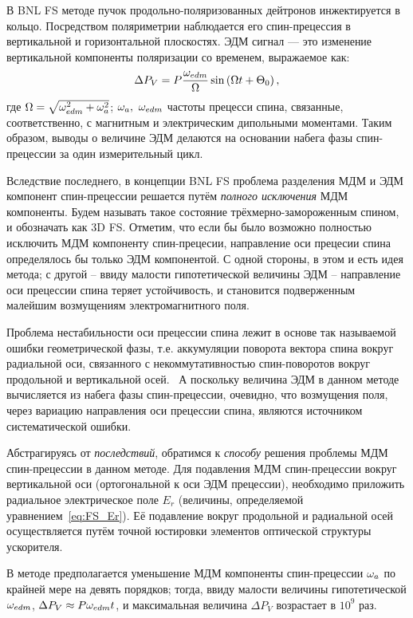 В BNL FS методе пучок продольно-поляризованных дейтронов инжектируется в кольцо. 
Посредством поляриметрии наблюдается его спин-прецессия в вертикальной и горизонтальной плоскостях. 
ЭДМ сигнал --- это изменение вертикальной компоненты поляризации со временем, 
выражаемое как:~\cite[стр.~8]{BNL:Deuteron2008}
\begin{equation}
  \Delta P_V = P\frac{\w_{edm}}{\W}\sin\bkt{\W t + \Theta_0},
\end{equation}
где $\Omega = \sqrt{\omega_{edm}^2 + \omega_a^2}$; $\omega_a,~\omega_{edm}$ частоты прецесси спина,
связанные, соответственно, с магнитным и электрическим дипольными моментами. 
Таким образом, выводы о величине ЭДМ делаются на основании набега фазы спин-прецессии 
за один измерительный цикл.

Вследствие последнего, в концепции BNL FS проблема разделения МДМ и ЭДМ компонент спин-прецессии
решается путём \emph{полного исключения} МДМ компоненты. 
Будем называть такое состояние  трёхмерно-замороженным спином, и обозначать как 3D FS. 
Отметим, что если бы было возможно полностью исключить МДМ компоненту спин-прецесии, 
направление оси прецесии спина определялось бы только ЭДМ компонентой.
С одной стороны, в этом и есть идея метода; с другой -- ввиду малости гипотетической величины ЭДМ --
направление оси прецессии спина теряет устойчивость, и становится подверженным малейшим возмущениям
электромагнитного поля. 

Проблема нестабильности оси прецессии спина лежит в основе так называемой 
ошибки геометрической фазы, т.е. аккумуляции поворота вектора спина вокруг радиальной оси, 
связанного с некоммутативностью спин-поворотов 
вокруг продольной и вертикальной осей.~\cite[стр.~23]{BNL:Deuteron2008} 
А поскольку величина ЭДМ в данном методе вычисляется из набега фазы спин-прецессии, очевидно, что
возмущения поля, через вариацию направления оси прецессии спина, являются источником
систематической ошибки.

Абстрагируясь от \emph{последствий}, обратимся к \emph{способу} решения проблемы 
МДМ спин-прецессии в данном методе.
Для подавления МДМ спин-прецессии вокруг вертикальной оси 
(ортогональной к оси ЭДМ прецессии), необходимо приложить
 радиальное электрическое поле $E_r$ (величины, определяемой уравнением~\eqref{eq:FS_Er}). 
Её подавление вокруг продольной и радиальной осей осуществляется путём
точной юстировки элементов оптической структуры ускорителя.

В методе предполагается уменьшение МДМ компоненты спин-прецессии $\omega_a$ 
по крайней мере на девять порядков; тогда, ввиду
малости величины гипотетической $\omega_{edm}$, ${\Delta P_V\approx P\omega_{edm} t}$, 
и максимальная величина $\Delta P_V$ возрастает в $10^9$ раз.

